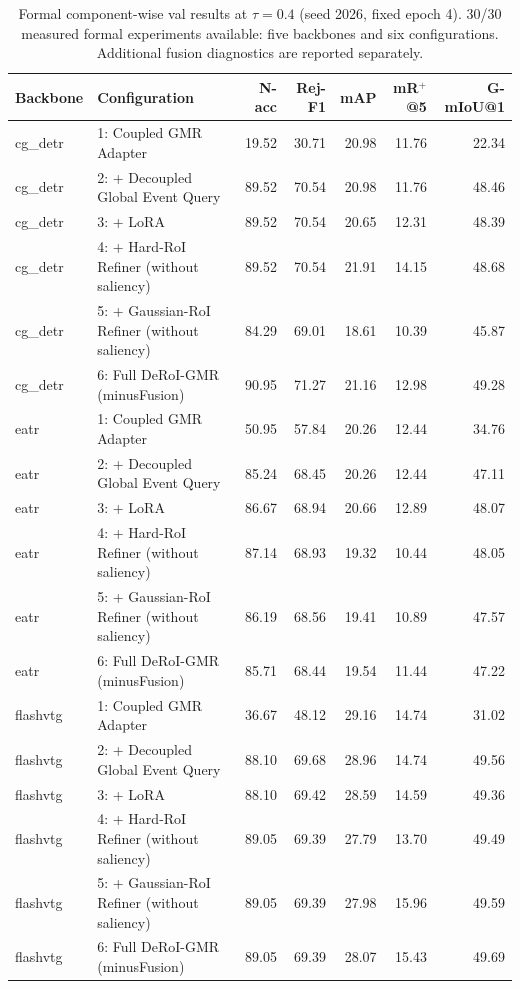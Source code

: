\begin{table}[t]
\centering
\small
\caption{Formal component-wise val results at $\tau=0.4$ (seed 2026, fixed epoch 4). 30/30 measured formal experiments available: five backbones and six configurations. Additional fusion diagnostics are reported separately.}
\begin{tabular}{llrrrrr}
\hline
Backbone & Configuration & N-acc & Rej-F1 & mAP & mR$^+$@5 & G-mIoU@1 \\
\hline
cg\_detr & 1: Coupled GMR Adapter & 19.52 & 30.71 & 20.98 & 11.76 & 22.34 \\
cg\_detr & 2: + Decoupled Global Event Query & 89.52 & 70.54 & 20.98 & 11.76 & 48.46 \\
cg\_detr & 3: + LoRA & 89.52 & 70.54 & 20.65 & 12.31 & 48.39 \\
cg\_detr & 4: + Hard-RoI Refiner (without saliency) & 89.52 & 70.54 & 21.91 & 14.15 & 48.68 \\
cg\_detr & 5: + Gaussian-RoI Refiner (without saliency) & 84.29 & 69.01 & 18.61 & 10.39 & 45.87 \\
cg\_detr & 6: Full DeRoI-GMR (minusFusion) & 90.95 & 71.27 & 21.16 & 12.98 & 49.28 \\
eatr & 1: Coupled GMR Adapter & 50.95 & 57.84 & 20.26 & 12.44 & 34.76 \\
eatr & 2: + Decoupled Global Event Query & 85.24 & 68.45 & 20.26 & 12.44 & 47.11 \\
eatr & 3: + LoRA & 86.67 & 68.94 & 20.66 & 12.89 & 48.07 \\
eatr & 4: + Hard-RoI Refiner (without saliency) & 87.14 & 68.93 & 19.32 & 10.44 & 48.05 \\
eatr & 5: + Gaussian-RoI Refiner (without saliency) & 86.19 & 68.56 & 19.41 & 10.89 & 47.57 \\
eatr & 6: Full DeRoI-GMR (minusFusion) & 85.71 & 68.44 & 19.54 & 11.44 & 47.22 \\
flashvtg & 1: Coupled GMR Adapter & 36.67 & 48.12 & 29.16 & 14.74 & 31.02 \\
flashvtg & 2: + Decoupled Global Event Query & 88.10 & 69.68 & 28.96 & 14.74 & 49.56 \\
flashvtg & 3: + LoRA & 88.10 & 69.42 & 28.59 & 14.59 & 49.36 \\
flashvtg & 4: + Hard-RoI Refiner (without saliency) & 89.05 & 69.39 & 27.79 & 13.70 & 49.49 \\
flashvtg & 5: + Gaussian-RoI Refiner (without saliency) & 89.05 & 69.39 & 27.98 & 15.96 & 49.59 \\
flashvtg & 6: Full DeRoI-GMR (minusFusion) & 89.05 & 69.39 & 28.07 & 15.43 & 49.69 \\

\end{tabular}
\end{table}
